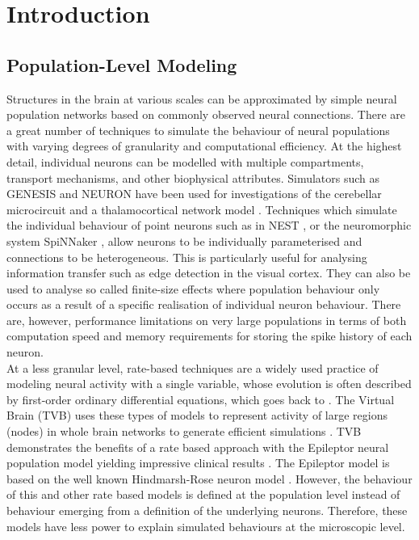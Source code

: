 \documentclass[utf8]{frontiersSCNS} %
\begin{document}
\section{Introduction}

\subsection{Population-Level Modeling}
Structures in the brain at various scales can be approximated by simple neural population networks based on commonly observed neural connections. There are a great number of techniques to simulate the behaviour of neural populations with varying degrees of granularity and computational efficiency. 
At the highest detail, individual neurons can be modelled with multiple compartments, transport mechanisms, and other biophysical attributes. Simulators such as GENESIS \citep{wilson1988genesis,bower2012book} and NEURON \citep{hines2001neuron} have been used for investigations of the cerebellar microcircuit \citep{d2016modeling} and a thalamocortical network model \citep{traub2005single}. Techniques which simulate the individual behaviour of point neurons such as in NEST \citep{Gewaltig:NEST}, or the neuromorphic system SpiNNaker \citep{9fed179f612a405b8801b67ef74bc737}, allow neurons to be individually parameterised and connections to be heterogeneous. This is particularly useful for analysing information transfer such as edge detection in the visual cortex. They can also be used to analyse so called finite-size effects where population behaviour only occurs as a result of a specific realisation of individual neuron behaviour. There are, however, performance limitations on very large populations in terms of both computation speed and memory requirements for storing the spike history of each neuron. \\

At a less granular level, rate-based techniques are a widely used practice of modeling neural activity with a single variable, whose evolution is often described by first-order ordinary differential equations, which goes back to \cite{wilson1972excitatory}. The Virtual Brain (TVB) uses these types of models to represent activity of large regions (nodes) in whole brain networks to generate efficient simulations \citep{sanz2013virtual,jirsa2014nature}. TVB demonstrates the benefits of a rate based approach with the Epileptor neural population model yielding impressive clinical results \citep{proix2017individual}. The Epileptor model is based on the well known Hindmarsh-Rose neuron model \citep{hindmarsh1984model}. However, the behaviour of this and other rate based models is defined at the population level instead of behaviour emerging from a definition of the underlying neurons. Therefore, these models have less power to explain simulated behaviours at the microscopic level.\\
\end{document}
